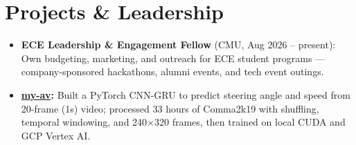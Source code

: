 \documentclass[11pt, letterpaper]{article}
\begin{document}
\section{Projects \& Leadership}
\begin{itemize}
  \item \textbf{ECE Leadership \& Engagement Fellow} (CMU, Aug 2026 -- present): Own budgeting, marketing, and outreach for ECE student programs --- company-sponsored hackathons, alumni events, and tech event outings.
  \item \textbf{\href{https://github.com/lordphone/my-av}{my-av}:} Built a PyTorch CNN-GRU to predict steering angle and speed from 20-frame (1s) video; processed 33 hours of Comma2k19 with shuffling, temporal windowing, and 240$\times$320 frames, then trained on local CUDA and GCP Vertex AI.
\end{itemize}
\end{document}
